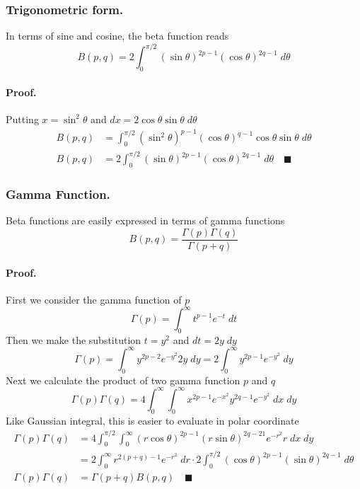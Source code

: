 \documentclass[../../main.tex]{subfiles}
\begin{document}
\subsubsection*{Trigonometric form.} In terms of sine and cosine, the beta function reads 
\begin{equation*}
    B(p,q)=2\int_{0}^{\pi/2}(\sin \theta)^{2p-1}(\cos\theta)^{2q-1}\;d\theta
\end{equation*}

\paragraph{Proof.} Putting $x=\sin^2\theta$ and $dx=2\cos\theta\sin\theta\;d\theta$
\begin{align*}
    B(p,q)&=\int_{0}^{\pi/2} (\sin^2\theta)^{p-1}(\cos\theta)^{q-1} \cos\theta\sin\theta\;d\theta\\
    B(p,q)&=2\int_{0}^{\pi/2} (\sin \theta)^{2p-1}(\cos\theta)^{2q-1}\;d\theta\quad\blacksquare
\end{align*}

\subsubsection*{Gamma Function.}  Beta functions are easily expressed in terms of gamma functions
\begin{equation*}
    B(p,q)=\frac{\Gamma(p)\Gamma(q)}{\Gamma(p+q)}
\end{equation*}

\paragraph{Proof.} First we consider the gamma function of $p$
\begin{equation*}
    \Gamma(p)=\int_{0}^{\infty}t^{p-1}e^{-t}\;dt
\end{equation*}
Then we make the substitution $t=y^2$ and $dt=2y\;dy$
\begin{equation*}
    \Gamma(p)=\int_{0}^{\infty}y^{2p-2}e^{-y^2}2y\;dy=2\int_{0}^{\infty}y^{2p-1}e^{-y^2}\;dy
\end{equation*}
Next we calculate the product of two gamma function $p$ and $q$
\begin{equation*}
    \Gamma(p)\Gamma(q)=4\int_{0}^{\infty}\int_{0}^{\infty} x^{2p-1}e^{-x^2} y^{2q-1}e^{-y^2}\;dx\;dy
\end{equation*}
Like Gaussian integral, this is easier to evaluate in polar coordinate
\begin{align*}
    \Gamma(p)\Gamma(q)&=4\int_{0}^{\pi/2}\int_{0}^{\infty} (r\cos\theta)^{2p-1} (r\sin\theta)^{2q-21}e^{-r^2}r\;dx\;dy\\
    &=2\int_{0}^{\infty}r^{2(p+q)-1}e^{-r^2}\;dr\cdot 2\int_{0}^{\pi/2} (\cos\theta)^{2p-1}(\sin\theta)^{2q-1}\;d\theta\\
    \Gamma(p)\Gamma(q)&=\Gamma(p+q)B(p,q)\quad\blacksquare
\end{align*}
\end{document}
